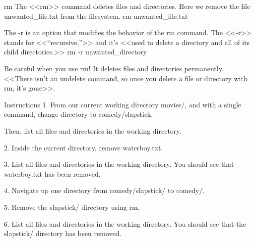 rm
    The <<rm>> command deletes files and directories. Here we remove the file unwanted_file.txt from the filesystem.
        rm unwanted_file.txt
    
    The -r is an option that modifies the behavior of the rm command. The <<-r>> stands for <<“recursive,”>> and it’s <<used to delete a directory and all of its child directories.>>
        rm -r unwanted_directory
    
    Be careful when you use rm! It deletes files and directories permanently. <<There isn’t an undelete command, so once you delete a file or directory with rm, it’s gone>>.

Instructions
    1.
    From our current working directory movies/, and with a single command, change directory to comedy/slapstick.

    Then, list all files and directories in the working directory.

    2.
    Inside the current directory, remove waterboy.txt.

    3.
    List all files and directories in the working directory. You should see that waterboy.txt has been removed.

    4.
    Navigate up one directory from comedy/slapstick/ to comedy/.

    5.
    Remove the slapstick/ directory using rm.

    6.
    List all files and directories in the working directory. You should see that the slapstick/ directory has been removed.